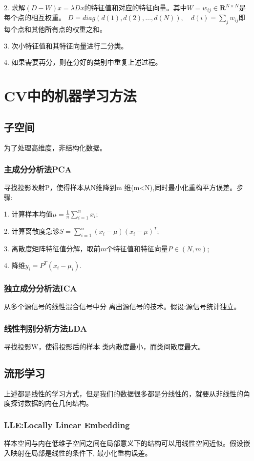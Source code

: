 \documentclass[12pt]{article}
\begin{document}
2. 求解$(D-W)x=\lambda Dx$的特征值和对应的特征向量。其中$W={w_{ij}}\in\mathbf{R}^{N\times N}$是每个点的相互权重。
$D=diag(d(1),d(2),..., d(N)),\quad d(i)=\sum_jw_{ij}$即每个点和其他所有点的权重之和。

3. 次小特征值和其特征向量进行二分类。

4. 如果需要再分，则在分好的类别中重复上述过程。

\section{CV中的机器学习方法}
\subsection{子空间}
为了处理高维度，非结构化数据。

\subsubsection{主成分分析法PCA}
寻找投影映射P，使得样本从N维降到m 维(m<N),同时最小化重构平方误差。步骤:

1. 计算样本均值$\mu=\frac{1}{n}\sum_{i=1}^{n}x_i$;

2. 计算离散度急诊$S=\sum_{i=1}^{n}\left(x_{i}-\mu\right)\left(x_{i}-\mu\right)^{T}$;

3. 离散度矩阵特征值分解，取前$m$个特征值和特征向量$P\in(N,m)$;

4. 降维$y_i=P^T(x_i-\mu_i)$.

\subsubsection{独立成分分析法ICA}
从多个源信号的线性混合信号中分 离出源信号的技术。假设:源信号统计独立。

\subsubsection{线性判别分析方法LDA}
寻找投影W，使得投影后的样本 类内散度最小，而类间散度最大。

\subsection{流形学习}
上述都是线性的学习方式，但是我们的数据很多都是分线性的，就要从非线性的角度探讨数据的内在几何结构。
\subsubsection{LLE:Locally Linear Embedding}
样本空间与内在低维子空间之间在局部意义下的结构可以用线性空间近似。假设嵌入映射在局部是线性的条件下, 最小化重构误差。
\end{document}
